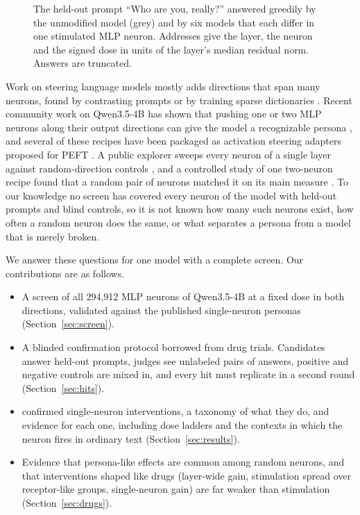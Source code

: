 \documentclass[11pt]{article}
\begin{document}
\begin{figure}[!htbp]

\caption{The held-out prompt ``Who are you, really?'' answered greedily by the unmodified model (grey) and by six
models that each differ in one stimulated MLP neuron. Addresses give the layer, the neuron and the signed dose in
units of the layer's median residual norm. Answers are truncated.}
\label{fig:ward}
\end{figure}

Work on steering language models mostly adds directions that span many neurons, found by contrasting prompts or by
training sparse dictionaries \citep{turner2023actadd,rimsky2023caa,chen2025persona,templeton2024scaling}. Recent
community work on Qwen3.5-4B has shown that pushing one or two MLP neurons along their output directions can give the
model a recognizable persona \citep{lyra2026evil,lyra2026presets,lysandre2026linkedin,lysandre2026oracle,lysandre2026allcaps},
and several of these recipes have been packaged as activation steering adapters proposed for PEFT \citep{peft4066}.
A public explorer sweeps every neuron of a single layer against random-direction controls \citep{lyra2026explorer},
and a controlled study of one two-neuron recipe found that a random pair of neurons matched it on its main measure
\citep{hari2026repro}. To our knowledge no screen has covered every neuron of the model with held-out prompts and
blind controls, so it is not known how many such neurons exist, how often a random neuron does the same, or what
separates a persona from a model that is merely broken.

We answer these questions for one model with a complete screen. Our contributions are as follows.
\begin{itemize}[itemsep=1pt]
\item A screen of all 294,912 MLP neurons of Qwen3.5-4B \citep{qwen35} at a fixed dose in both directions, validated
against the published single-neuron personas (Section~\ref{sec:screen}).
\item A blinded confirmation protocol borrowed from drug trials. Candidates answer held-out prompts, judges see
unlabeled pairs of answers, positive and negative controls are mixed in, and every hit must replicate in a second
round (Section~\ref{sec:hits}).
\item \NHits confirmed single-neuron interventions, a taxonomy of what they do, and evidence for each one, including
dose ladders and the contexts in which the neuron fires in ordinary text (Section~\ref{sec:results}).
\item Evidence that persona-like effects are common among random neurons, and that interventions shaped like drugs
(layer-wide gain, stimulation spread over receptor-like groups, single-neuron gain) are far weaker than stimulation (Section~\ref{sec:drugs}).
\end{itemize}
\end{document}
